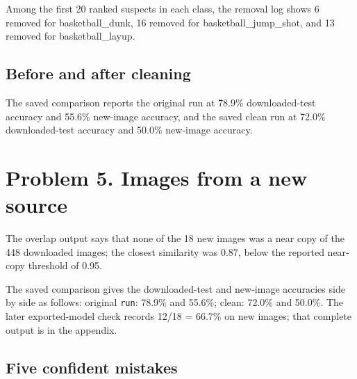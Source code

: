 \documentclass[11pt]{article}
\begin{document}
Among the first 20 ranked suspects in each class, the removal log shows 6 removed for basketball\_dunk, 16 removed for basketball\_jump\_shot, and 13 removed for basketball\_layup. 

\subsection*{Before and after cleaning}

The saved comparison reports the original run at 78.9\% downloaded-test accuracy and 55.6\% new-image accuracy, and the saved clean run at 72.0\% downloaded-test accuracy and 50.0\% new-image accuracy. 

\begin{center}\end{center}

\section*{Problem 5. Images from a new source}



The overlap output says that none of the 18 new images was a near copy of the 448 downloaded images; the closest similarity was 0.87, below the reported near-copy threshold of 0.95.

The saved comparison gives the downloaded-test and new-image accuracies side by side as follows: original \texttt{run}: 78.9\% and 55.6\%; clean: 72.0\% and 50.0\%. The later exported-model check records 12/18 = 66.7\% on new images; that complete output is in the appendix.

\subsection*{Five confident mistakes}
\end{document}
